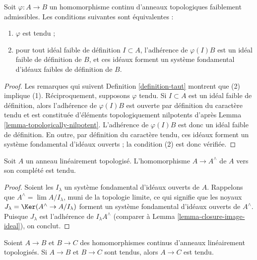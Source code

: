\begin{lemma}
\label{lemma-taut-weakly-admissible}
Soit $\varphi : A \to B$ un homomorphisme continu d'anneaux topologiques
faiblement admissibles. Les conditions suivantes sont équivalentes :
\begin{enumerate}
\item $\varphi$ est tendu ;
\item pour tout idéal faible de définition $I \subset A$, l'adhérence de
$\varphi(I)B$ est un idéal faible de définition de $B$, et ces idéaux forment un
système fondamental d'idéaux faibles de définition de $B$.
\end{enumerate}
\end{lemma}

\begin{proof}
Les remarques qui suivent Definition \ref{definition-taut} montrent que
(2) implique (1). Réciproquement, supposons $\varphi$ tendu. Si $I \subset A$
est un idéal faible de définition, alors l'adhérence de $\varphi(I)B$
est ouverte par définition du caractère tendu et est constituée d'éléments topologiquement
nilpotents d'après Lemma \ref{lemma-topologically-nilpotent}.
L'adhérence de $\varphi(I)B$ est donc un idéal faible de définition.
En outre, par définition du caractère tendu, ces idéaux forment un
système fondamental d'idéaux ouverts ; la condition (2) est donc vérifiée.
\end{proof}

\begin{lemma}
\label{lemma-completion-taut}
Soit $A$ un anneau linéairement topologisé. L'homomorphisme $A \to A^\wedge$
de $A$ vers son complété est tendu.
\end{lemma}

\begin{proof}
Soient les $I_\lambda$ un système fondamental d'idéaux ouverts de $A$.
Rappelons que $A^\wedge = \lim A/I_\lambda$, muni de la topologie limite,
ce qui signifie que les noyaux $J_\lambda = \Ker(A^\wedge \to A/I_\lambda)$
forment un système fondamental d'idéaux ouverts de $A^\wedge$.
Puisque $J_\lambda$ est l'adhérence de $I_\lambda A^\wedge$
(comparer à Lemma \ref{lemma-closure-image-ideal}), on conclut.
\end{proof}

\begin{lemma}
\label{lemma-composition-taut}
Soient $A \to B$ et $B \to C$ des homomorphismes continus d'anneaux
linéairement topologisés. Si $A \to B$ et $B \to C$ sont tendus, alors
$A \to C$ est tendu.
\end{lemma}

